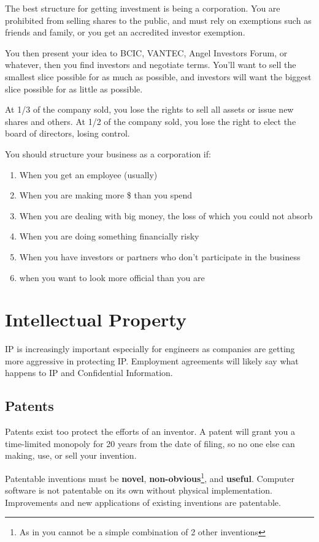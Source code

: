 \documentclass{article}
\begin{document}
The best structure for getting investment is being a corporation. You are prohibited from selling shares to the public, and must rely on exemptions such as friends and family, or  you get an accredited investor exemption.

You then present your idea to BCIC, VANTEC, Angel Investors Forum, or whatever, then you find investors and negotiate terms. You'll want to sell the smallest slice possible for as much as possible, and investors will want the biggest slice possible for as little as possible.

At 1/3 of the company sold, you lose the rights to sell all assets or issue new shares and others. At 1/2 of the company sold, you lose the right to elect the board of directors, losing control.

\noindent You should structure your business as a corporation if: \begin{enumerate}
\item When you get an employee (usually)
\item When you are making more \$ than you spend
\item When you are dealing with big money, the loss of which you could not absorb
\item When you are doing something financially risky
\item When you have investors or partners who don't participate in the business
\item when you want to look more official than you are
\end{enumerate}

\section{Intellectual Property}

IP is increasingly important especially for engineers as companies are getting more aggressive in protecting IP. Employment agreements will likely say what happens to IP and Confidential Information.

\subsection{Patents}

Patents exist too protect the efforts of an inventor. A patent will grant you a time-limited monopoly for 20 years from the date of filing, so no one else can making, use, or sell your invention.

Patentable inventions must be \textbf{novel}, \textbf{non-obvious}\footnote{As in you cannot be a simple combination of 2 other inventions}, and \textbf{useful}. Computer software is not patentable on its own without physical implementation. Improvements and new applications of existing inventions are patentable.
\end{document}
